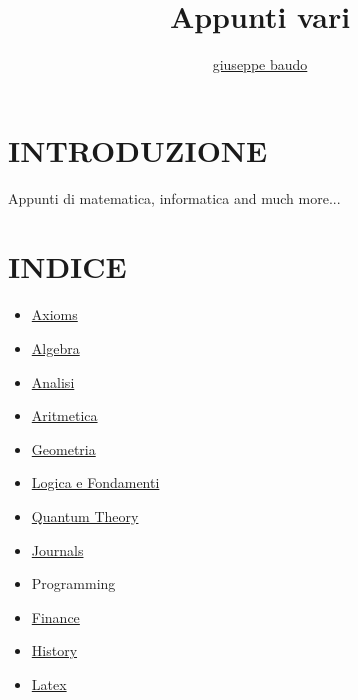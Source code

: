 \documentclass[a4paper,10pt]{article}
\title{Appunti vari}
\author{\href{http://www.baudo.hol.es}{giuseppe baudo}}
\begin{document}
\maketitle

\section{INTRODUZIONE}
Appunti di matematica, informatica and much more...

\section{INDICE}
\begin{itemize}
  \item \href{./Axioms.html}{Axioms}
  \item \href{./AlgebraIndex.html}{Algebra}
  \item \href{./Analisi.html}{Analisi} 
  \item \href{./Aritmetica.html}{Aritmetica}
  \item \href{./Geometria.html}{Geometria} 
  \item \href{./Logics.html}{Logica e Fondamenti}
  \item \href{./QuantumTheory.html}{Quantum Theory}
  \item \href{./Journals.html}{Journals}
  \item Programming
  \item \href{./finance.html}{Finance} 
  \item \href{./history.html}{History} 
  \item \href{./latex.html}{Latex} 
  
\end{itemize}
\end{document}
